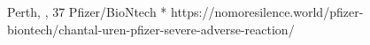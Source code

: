           {
            Perth, , 
          }
          {
            37
          }
          {
            Pfizer/BioNtech
          }
          {
            *
          }
          {
          }
          {
            https://nomoresilence.world/pfizer-biontech/chantal-uren-pfizer-severe-adverse-reaction/
          }

